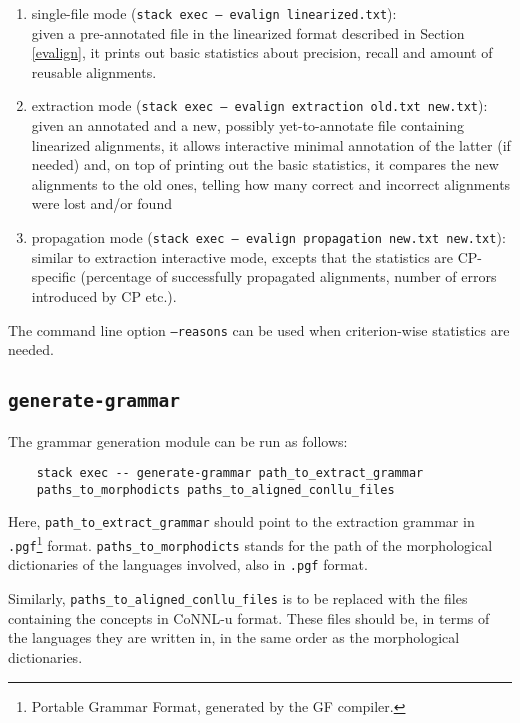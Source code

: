 \begin{enumerate}
    \item single-file mode (\texttt{stack exec -- evalign linearized.txt}): \\given a pre-annotated file in the linearized format described in Section \ref{evalign}, it prints out basic statistics about precision, recall and amount of reusable alignments.
    \item extraction mode (\texttt{stack exec -- evalign extraction old.txt new.txt}): \\given an annotated and a new, possibly yet-to-annotate file containing linearized alignments, it allows interactive minimal annotation of the latter (if needed) and, on top of printing out the basic statistics, it compares the new alignments to the old ones, telling how many correct and incorrect alignments were lost and/or found
    \item propagation mode (\texttt{stack exec -- evalign propagation new.txt new.txt}): similar to extraction interactive mode, excepts that the statistics are CP-specific (percentage of successfully propagated alignments, number of errors introduced by CP etc.).
\end{enumerate} \smallskip

The command line option \texttt{--reasons} can be used when criterion-wise statistics are needed.

\subsection{\texttt{generate-grammar}}
The grammar generation module can be run as follows: \smallskip

\begin{verbatim}
    stack exec -- generate-grammar path_to_extract_grammar 
    paths_to_morphodicts paths_to_aligned_conllu_files
\end{verbatim} \smallskip

Here, \texttt{path\_to\_extract\_grammar} should point to the extraction grammar in \texttt{.pgf}\footnote{Portable Grammar Format, generated by the GF compiler.} format. \texttt{paths\_to\_morphodicts} stands for the path of the morphological dictionaries of the languages involved, also in \texttt{.pgf} format. 

Similarly, \texttt{paths\_to\_aligned\_conllu\_files} is to be replaced with the files containing the concepts in CoNNL-u format. These files should be, in terms of the languages they are written in, in the same order as the morphological dictionaries.

